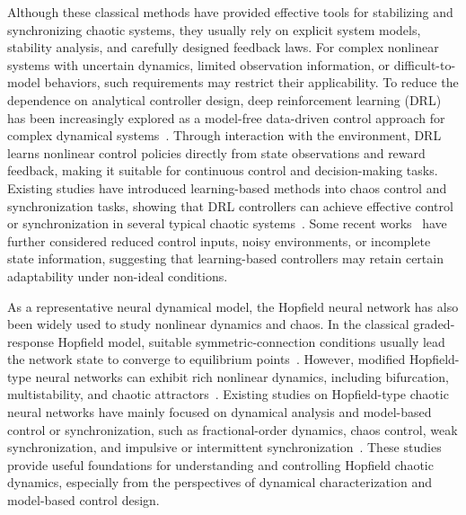 \documentclass[10pt,twocolumn]{article}
\theoremstyle{definition}
\begin{document}
Although these classical methods have provided effective tools for stabilizing and synchronizing chaotic systems, they usually rely on explicit system models, stability analysis, and carefully designed feedback laws. For complex nonlinear systems with uncertain dynamics, limited observation information, or difficult-to-model behaviors, such requirements may restrict their applicability. To reduce the dependence on analytical controller design, deep reinforcement learning (DRL) has been increasingly explored as a model-free data-driven control approach for complex dynamical systems~\cite{sutton2018reinforcement,mnih2015human,carlucho2020adaptive}. Through interaction with the environment, DRL learns nonlinear control policies directly from state observations and reward feedback, making it suitable for continuous control and decision-making tasks. Existing studies have introduced learning-based methods into chaos control and synchronization tasks, showing that DRL controllers can achieve effective control or synchronization in several typical chaotic systems~\cite{bucci2019control,vashishtha2020restoring,han2021control,cheng2023deep,cheng2025generalized,yau2024ppo,xu2025ppo}. Some recent works~\cite{jin2025Deep,weissenbacher2025reinforcement} have further considered reduced control inputs, noisy environments, or incomplete state information, suggesting that learning-based controllers may retain certain adaptability under non-ideal conditions.

As a representative neural dynamical model, the Hopfield neural network has also been widely used to study nonlinear dynamics and chaos. In the classical graded-response Hopfield model, suitable symmetric-connection conditions usually lead the network state to converge to equilibrium points~\cite{hopfield1984neurons}. However, modified Hopfield-type neural networks can exhibit rich nonlinear dynamics, including bifurcation, multistability, and chaotic attractors~\cite{LI2013a,zheng2010double,bao2017numerical}. Existing studies on Hopfield-type chaotic neural networks have mainly focused on dynamical analysis and model-based control or synchronization, such as fractional-order dynamics, chaos control, weak synchronization, and impulsive or intermittent synchronization~\cite{mahmoud2021analysis,zhang2011weak,cao2024synchronisation,wu2023stability}. These studies provide useful foundations for understanding and controlling Hopfield chaotic dynamics, especially from the perspectives of dynamical characterization and model-based control design.
\end{document}
